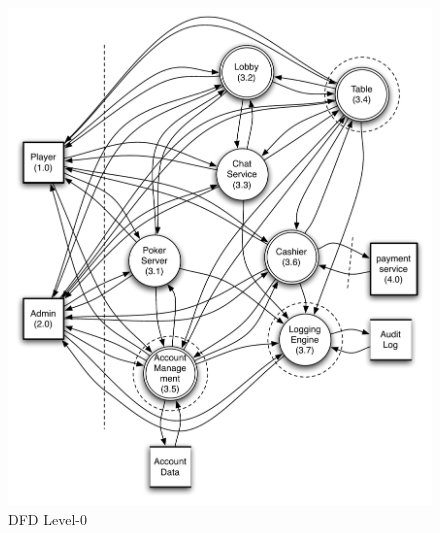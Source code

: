 \documentclass[a4paper,11pt]{report}
\begin{document}
\begin{figure}[htpb]
  \begin{center}
    \includegraphics[scale=0.8]{dfd_level_0}
  \end{center}
  \caption{DFD Level-0}\label{fig:level_0}
\end{figure}
\end{document}

